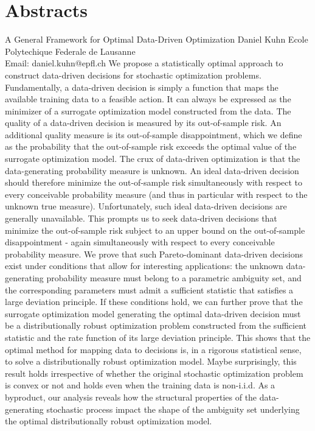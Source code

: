 \documentclass[
	openany, %
	parskip=full, %
	12pt, %
	a4paper, %
]{conferencebooklet} %
\begin{document}
\chapter*{Abstracts}
\abstract
    {A General Framework for Optimal Data-Driven Optimization}
    {Daniel Kuhn}
    {}
    {Ecole Polytechique Federale de Lausanne\\
    Email: daniel.kuhn@epfl.ch}
    {We propose a statistically optimal approach to construct data-driven decisions for stochastic optimization problems. Fundamentally, a data-driven decision is simply a function that maps the available training data to a feasible action. It can always be expressed as the minimizer of a surrogate optimization model constructed from the data. The quality of a data-driven decision is measured by its out-of-sample risk. An additional quality measure is its out-of-sample disappointment, which we define as the probability that the out-of-sample risk exceeds the optimal value of the surrogate optimization model. The crux of data-driven optimization is that the data-generating probability measure is unknown. An ideal data-driven decision should therefore minimize the out-of-sample risk simultaneously with respect to every conceivable probability measure (and thus in particular with respect to the unknown true measure). Unfortunately, such ideal data-driven decisions are generally unavailable. This prompts us to seek data-driven decisions that minimize the out-of-sample risk subject to an upper bound on the out-of-sample disappointment - again simultaneously with respect to every conceivable probability measure. We prove that such Pareto-dominant data-driven decisions exist under conditions that allow for interesting applications: the unknown data-generating probability measure must belong to a parametric ambiguity set, and the corresponding parameters must admit a sufficient statistic that satisfies a large deviation principle. If these conditions hold, we can further prove that the surrogate optimization model generating the optimal data-driven decision must be a distributionally robust optimization problem constructed from the sufficient statistic and the rate function of its large deviation principle. This shows that the optimal method for mapping data to decisions is, in a rigorous statistical sense, to solve a distributionally robust optimization model. Maybe surprisingly, this result holds irrespective of whether the original stochastic optimization problem is convex or not and holds even when the training data is non-i.i.d. As a byproduct, our analysis reveals how the structural properties of the data-generating stochastic process impact the shape of the ambiguity set underlying the optimal distributionally robust optimization model.}
\end{document}
